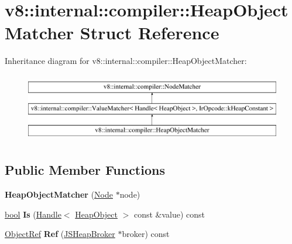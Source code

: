 \hypertarget{structv8_1_1internal_1_1compiler_1_1HeapObjectMatcher}{}\section{v8\+:\+:internal\+:\+:compiler\+:\+:Heap\+Object\+Matcher Struct Reference}
\label{structv8_1_1internal_1_1compiler_1_1HeapObjectMatcher}
Inheritance diagram for v8\+:\+:internal\+:\+:compiler\+:\+:Heap\+Object\+Matcher\+:\begin{figure}[H]
\begin{center}
\leavevmode
\includegraphics[height=3.000000cm]{structv8_1_1internal_1_1compiler_1_1HeapObjectMatcher}
\end{center}
\end{figure}
\subsection*{Public Member Functions}
\begin{DoxyCompactItemize}
\item 
\mbox{\label{structv8_1_1internal_1_1compiler_1_1HeapObjectMatcher_a12f5ba19862844aeb1cdd34a9cfadaf3}} 
{\bfseries Heap\+Object\+Matcher} (\mbox{\hyperlink{classv8_1_1internal_1_1compiler_1_1Node}{Node}} $\ast$node)
\item 
\mbox{\label{structv8_1_1internal_1_1compiler_1_1HeapObjectMatcher_af8658ee14d84a216cf62ecaafc2e20e5}} 
\mbox{\hyperlink{classbool}{bool}} {\bfseries Is} (\mbox{\hyperlink{classv8_1_1internal_1_1Handle}{Handle}}$<$ \mbox{\hyperlink{classv8_1_1internal_1_1HeapObject}{Heap\+Object}} $>$ const \&value) const
\item 
\mbox{\label{structv8_1_1internal_1_1compiler_1_1HeapObjectMatcher_a374e36591f11d576cd6938c0e450d044}} 
\mbox{\hyperlink{classv8_1_1internal_1_1compiler_1_1ObjectRef}{Object\+Ref}} {\bfseries Ref} (\mbox{\hyperlink{classv8_1_1internal_1_1compiler_1_1JSHeapBroker}{J\+S\+Heap\+Broker}} $\ast$broker) const
\end{DoxyCompactItemize}
